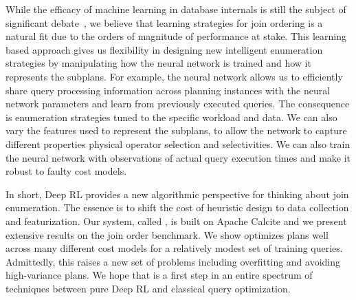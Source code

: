 While the efficacy of machine learning in database internals is still the subject of significant debate~\cite{btree, kraska2018case, mitzenmacher2018model}, we believe that learning strategies for join ordering is a natural fit due to the orders of magnitude of performance at stake. 
This learning based approach gives us flexibility in designing new intelligent enumeration strategies by manipulating how the neural network is trained and how it represents the subplans.
For example, the neural network allows us to efficiently share query processing information across planning instances with the neural network parameters and learn from previously executed queries.
The consequence is enumeration strategies tuned to the specific workload and data.
We can also vary the features used to represent the subplans, to allow the network to capture different properties physical operator selection and selectivities.
We can also train the neural network with observations of actual query execution times and make it robust to faulty cost models.

In short, Deep RL provides a new algorithmic perspective for thinking about join enumeration. 
The essence is to shift the cost of heuristic design to data collection and featurization.
Our system, called \sys, is built on Apache Calcite and we present extensive results on the join order benchmark.
We show \sys optimizes plans well across many different cost models for a relatively modest set of training queries.
Admittedly, this raises a new set of problems including overfitting and avoiding high-variance plans.
We hope that \sys is a first step in an entire spectrum of techniques between pure Deep RL and classical query optimization.


 

